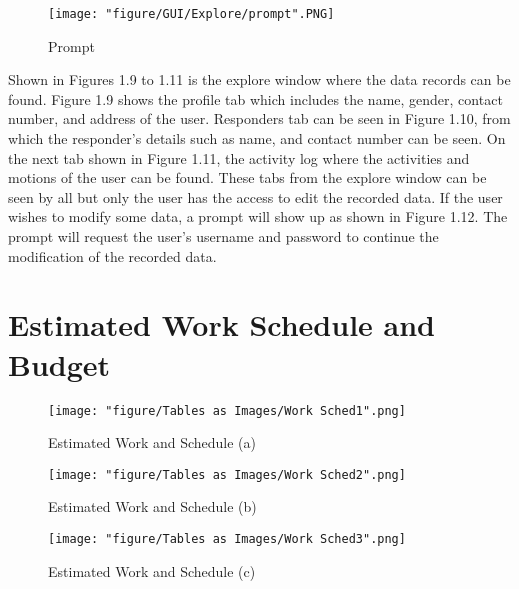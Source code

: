 \begin{figure}[htbp]
	\centering
		\texttt{[image: "figure/GUI/Explore/prompt".PNG]}
	\caption{Prompt}
	\label{fig:prompt}
\end{figure}

Shown in Figures 1.9 to 1.11 is the explore window where the data records can be found. Figure 1.9 shows the profile tab which includes the name, gender, contact number, and address of the user. Responders tab can be seen in Figure 1.10, from which the responder’s details such as name, and contact number can be seen. On the next tab shown in Figure 1.11, the activity log where the activities and motions of the user can be found. These tabs from the explore window can be seen by all but only  the user has the access to edit the recorded data. If the user wishes to modify some data, a prompt will show up as shown in Figure 1.12. The prompt will request the user’s username and password to continue the modification of the recorded data.

\section{Estimated Work Schedule and Budget}

\begin{figure}[H]
	\centering
		\texttt{[image: "figure/Tables as Images/Work Sched1".png]}
	\caption{Estimated Work and Schedule (a)}
	\label{fig:Work Sched1}
\end{figure}

\begin{figure}[H]
	\centering
		\texttt{[image: "figure/Tables as Images/Work Sched2".png]}
	\caption{Estimated Work and Schedule (b)}
	\label{fig:Work Sched2}
\end{figure}

\begin{figure}[H]
	\centering
		\texttt{[image: "figure/Tables as Images/Work Sched3".png]}
	\caption{Estimated Work and Schedule (c)}
	\label{fig:Work Sched3}
\end{figure}


